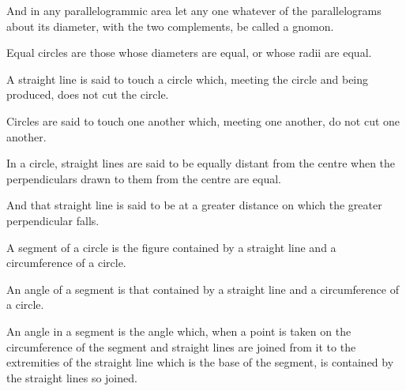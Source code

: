 \begin{scope}
\label{def:II.2}
And in any parallelogrammic area let any one whatever of the
parallelograms about its diameter, with the two complements, be
called a gnomon.
\end{scope}


\begin{scope}
\label{def:III.1}
Equal circles are those whose diameters are equal, or whose radii are
equal.
\end{scope}

\begin{scope}
\label{def:III.2}
A straight line is said to touch a circle which, meeting the circle
and being produced, does not cut the circle.
\end{scope}

\begin{scope}
\label{def:III.3}
Circles are said to touch one another which, meeting one another, do
not cut one another.
\end{scope}

\begin{scope}
\label{def:III.4}
In a circle, straight lines are said to be equally distant from the
centre when the perpendiculars drawn to them from the centre are
equal.
\end{scope}

\begin{scope}
\label{def:III.5}
And that straight line is said to be at a greater distance on which
the greater perpendicular falls.
\end{scope}

\begin{scope}
\label{def:III.6}
A segment of a circle is the figure contained by a straight line and
a circumference of a circle.
\end{scope}

\begin{scope}
\label{def:III.7}
An angle of a segment is that contained by a straight line and a
circumference of a circle.
\end{scope}

\begin{scope}
\label{def:III.8}
An angle in a segment is the angle which, when a point is taken on
the circumference of the segment and straight lines are joined from
it to the extremities of the straight line which is the base of the
segment, is contained by the straight lines so joined.
\end{scope}


